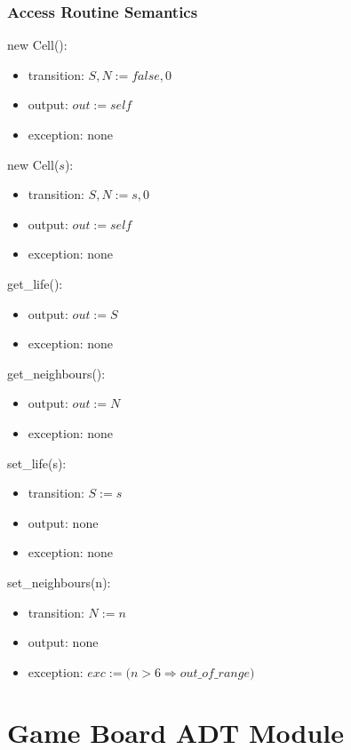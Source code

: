 \documentclass[12pt]{article}
\begin{document}
\subsubsection* {Access Routine Semantics}

new Cell():
\begin{itemize}
    \item transition: $S, N := false, 0$
    \item output: $\mathit{out := self}$
    \item exception: none
\end{itemize}

\noindent
new Cell($s$):
\begin{itemize}
    \item transition: $S, N := s, 0$
    \item output: $\mathit{out := self}$
    \item exception: none
\end{itemize}

\noindent
get\_life():
\begin{itemize}
    \item output: $\mathit{out := S}$
    \item exception: none
\end{itemize}

\noindent
get\_neighbours():
\begin{itemize}
    \item output: $\mathit{out := N}$
    \item exception: none
\end{itemize}

\noindent
set\_life(s):
\begin{itemize}
    \item transition: $\mathit{S := s}$
    \item output: none
    \item exception: none
\end{itemize}

\noindent
set\_neighbours(n):
\begin{itemize}
    \item transition: $\mathit{N := n}$
    \item output: none
    \item exception: $\mathit{exc := (n > 6} \Rightarrow out\_of\_range)$
\end{itemize}

\newpage

\section* {Game Board ADT Module}
\end{document}
